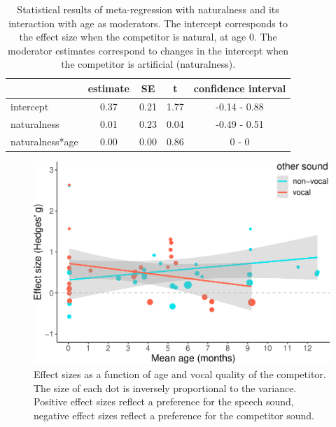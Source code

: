 \documentclass[
  man]{apa6}
\begin{document}
\begin{table}[tbp]
\begin{center}
\begin{threeparttable}
\caption{\label{tab:TableNatural}Statistical results of meta-regression with naturalness and its interaction with age as moderators. The intercept corresponds to the effect size when the competitor is natural, at age 0. The moderator estimates correspond to changes in the intercept when the competitor is artificial (naturalness).}
\begin{tabular}{lcccc}
\toprule
 & estimate & SE & t & confidence interval\\
\midrule
intercept & 0.37 & 0.21 & 1.77 & -0.14 - 0.88\\
naturalness & 0.01 & 0.23 & 0.04 & -0.49 - 0.51\\
naturalness*age & 0.00 & 0.00 & 0.86 & 0 - 0\\
\bottomrule
\end{tabular}
\end{threeparttable}
\end{center}
\end{table}

\begin{figure}
\centering
\includegraphics{MA_speech_pref_files/figure-latex/vocal-1.pdf}
\caption{\label{fig:vocal}Effect sizes as a function of age and vocal quality of the competitor. The size of each dot is inversely proportional to the variance. Positive effect sizes reflect a preference for the speech sound, negative effect sizes reflect a preference for the competitor sound.}
\end{figure}
\end{document}

